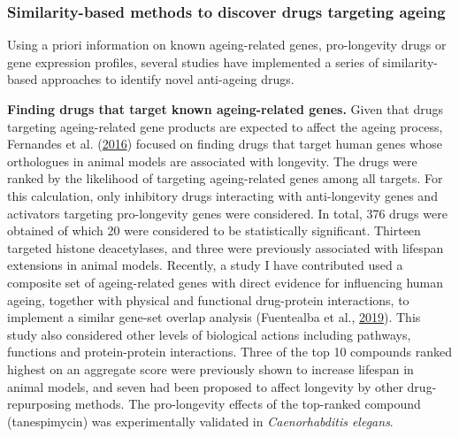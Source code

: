 \documentclass[12pt,twoside]{unicam}
\begin{document}
\hypertarget{drugSimMethods}{%
\subsubsection{Similarity-based methods to discover drugs targeting ageing}\label{drugSimMethods}}

Using a priori information on known ageing-related genes, pro-longevity drugs or gene expression profiles, several studies have implemented a series of similarity-based approaches to identify novel anti-ageing drugs.

\textbf{Finding drugs that target known ageing-related genes.} Given that drugs targeting ageing-related gene products are expected to affect the ageing process, Fernandes et al. (\protect\hyperlink{ref-Fernandes2016}{2016}) focused on finding drugs that target human genes whose orthologues in animal models are associated with longevity. The drugs were ranked by the likelihood of targeting ageing-related genes among all targets. For this calculation, only inhibitory drugs interacting with anti-longevity genes and activators targeting pro-longevity genes were considered. In total, 376 drugs were obtained of which 20 were considered to be statistically significant. Thirteen targeted histone deacetylases, and three were previously associated with lifespan extensions in animal models. Recently, a study I have contributed used a composite set of ageing-related genes with direct evidence for influencing human ageing, together with physical and functional drug-protein interactions, to implement a similar gene-set overlap analysis (Fuentealba et al., \protect\hyperlink{ref-Fuentealba2019}{2019}). This study also considered other levels of biological actions including pathways, functions and protein-protein interactions. Three of the top 10 compounds ranked highest on an aggregate score were previously shown to increase lifespan in animal models, and seven had been proposed to affect longevity by other drug-repurposing methods. The pro-longevity effects of the top-ranked compound (tanespimycin) was experimentally validated in \emph{Caenorhabditis elegans}.
\end{document}
